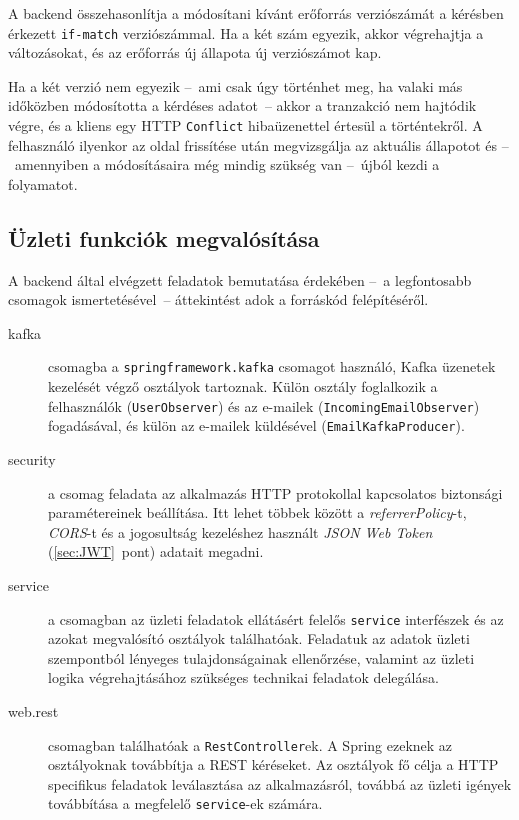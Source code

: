 A backend összehasonlítja a módosítani kívánt erőforrás verziószámát a kérésben érkezett \texttt{if-match} verziószámmal. Ha a két szám egyezik, akkor végrehajtja a változásokat, és az erőforrás új állapota új verziószámot kap.

Ha a két verzió nem egyezik --~ami csak úgy történhet meg, ha valaki más időközben módosította a kérdéses adatot~-- akkor a tranzakció nem hajtódik végre, és a kliens egy HTTP \texttt{Conflict} hibaüzenettel értesül a történtekről. A felhasználó ilyenkor az oldal frissítése után megvizsgálja az aktuális állapotot és --~amennyiben a módosításaira még mindig szükség van --~újból kezdi a folyamatot.

\subsection{Üzleti funkciók megvalósítása}
A backend által elvégzett feladatok bemutatása érdekében --~a legfontosabb csomagok ismertetésével~-- áttekintést adok a forráskód felépítéséről.


\begin{description}
	\item[kafka] csomagba a \texttt{springframework.kafka} csomagot használó, Kafka üzenetek kezelését végző osztályok tartoznak. Külön osztály foglalkozik a felhasználók (\texttt{UserObserver}) és az e-mailek (\texttt{IncomingEmailObserver}) fogadásával, és külön az e-mailek küldésével (\texttt{EmailKafkaProducer}).
	
	
	\item[security] a csomag feladata az alkalmazás HTTP protokollal kapcsolatos biztonsági paramétereinek beállítása. Itt lehet többek között a \emph{referrerPolicy}-t, \emph{CORS}-t és a jogosultság kezeléshez használt \emph{JSON Web Token} (\ref{sec:JWT}~pont) adatait megadni.
	
	
	\item[service] a csomagban az üzleti feladatok ellátásért felelős \texttt{service} interfészek és az azokat megvalósító osztályok találhatóak. Feladatuk az adatok üzleti szempontból lényeges tulajdonságainak ellenőrzése, valamint az üzleti logika végrehajtásához szükséges technikai feladatok delegálása. 
	

	\item[web.rest] csomagban találhatóak a \texttt{RestController}ek. A Spring ezeknek az osztályoknak továbbítja a REST kéréseket. Az osztályok fő célja a HTTP specifikus feladatok leválasztása az alkalmazásról, továbbá az üzleti igények továbbítása a megfelelő \texttt{service}-ek számára.	
\end{description}

